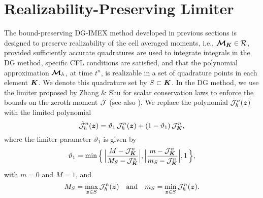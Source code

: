 \section{Realizability-Preserving Limiter}
\label{sec:limiter}

The bound-preserving DG-IMEX method developed in previous sections is designed to preserve realizability of the cell averaged moments, i.e., $\boldsymbol{\mathcal{M}}_{\boldsymbol{K}}\in\mathcal{R}$, provided sufficiently accurate quadratures are used to integrate integrals in the DG method, specific CFL conditions are satisfied, and that the polynomial approximation $\boldsymbol{\mathcal{M}}_{h}$, at time $t^{n}$, is realizable in a set of quadrature points in each element $\boldsymbol{K}$.  
We denote this quadrature set by $S\subset\boldsymbol{K}$.  
In the DG method, we use the limiter proposed by Zhang \& Shu \cite{zhangShu_2010a} for scalar conservation laws to enforce the bounds on the zeroth moment $\mathcal{J}$ (see also \cite{liuOsher_1996}).  
We replace the polynomial $\mathcal{J}_{h}^{n}(\boldsymbol{z})$ with the limited polynomial
\begin{equation}
  \tilde{\mathcal{J}}_{h}^{n}(\boldsymbol{z})
  =\vartheta_{1}\,\mathcal{J}_{h}^{n}(\boldsymbol{z})+(1-\vartheta_{1})\,\mathcal{J}_{\boldsymbol{K}}^{n},
  \label{eq:limitDensity}
\end{equation}
where the limiter parameter $\vartheta_{1}$ is given by
\begin{equation}
  \vartheta_{1}
  =\min\Big\{\,\Big|\frac{M-\mathcal{J}_{\boldsymbol{K}}^{n}}{M_{S}-\mathcal{J}_{\boldsymbol{K}}^{n}}\Big|,\Big|\frac{m-\mathcal{J}_{\boldsymbol{K}}^{n}}{m_{S}-\mathcal{J}_{\boldsymbol{K}}^{n}}\Big|,1\,\Big\},
\end{equation}
with $m=0$ and $M=1$, and
\begin{equation}
  M_{S}=\max_{\boldsymbol{z}\in S}\mathcal{J}_{h}^{n}(\boldsymbol{z})
  \quad\text{and}\quad
  m_{S}=\min_{\boldsymbol{z}\in S}\mathcal{J}_{h}^{n}(\boldsymbol{z}).  
\end{equation}

